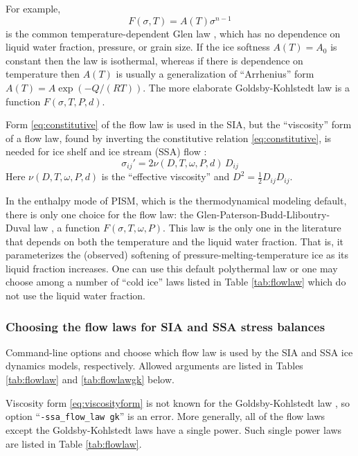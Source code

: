 For example,
\begin{equation}
F(\sigma,T) = A(T) \sigma^{n-1}  \label{eq:glen}
\end{equation}
is the common temperature-dependent Glen law \cite{PatersonBudd,BBL}, which has no dependence on liquid water fraction, pressure, or grain size.  If the ice softness $A(T)=A_0$ is constant then the law is isothermal, whereas if there is dependence on temperature then $A(T)$ is usually a generalization of ``Arrhenius'' form $A(T) = A \exp(-Q/(R T))$.  The more elaborate Goldsby-Kohlstedt law \cite{GoldsbyKohlstedt} is a function $F(\sigma,T,P,d)$.

Form \eqref{eq:constitutive} of the flow law is used in the SIA, but the ``viscosity'' form of a flow law, found by inverting the constitutive relation \eqref{eq:constitutive}, is needed for ice shelf and ice stream (SSA) flow \cite{BBssasliding}:
\begin{equation}
\sigma_{ij}' = 2 \nu(D,T,\omega,P,d)\,D_{ij}  \label{eq:viscosityform}
\end{equation}
Here $\nu(D,T,\omega,P,d)$ is the ``effective viscosity'' and $D^2 = \frac{1}{2} D_{ij} D_{ij}$.

In the enthalpy mode of PISM, which is the thermodynamical modeling default, there is only one choice for the flow law: the Glen-Paterson-Budd-Lliboutry-Duval law \cite{AschwandenBuelerKhroulevBlatter,LliboutryDuval1985,PatersonBudd}, a function $F(\sigma,T,\omega,P)$.  This law is the only one in the literature that depends on both the temperature and the liquid water fraction.  That is, it parameterizes the (observed) softening of pressure-melting-temperature ice as its liquid fraction increases.  One can use this default polythermal law or one may choose among a number of ``cold ice'' laws listed in Table \ref{tab:flowlaw} which do not use the liquid water fraction.  

\subsubsection*{Choosing the flow laws for SIA and SSA stress balances}  Command-line options  and  choose which flow law is used by the SIA and SSA ice dynamics models, respectively.  Allowed arguments are listed in Tables \ref{tab:flowlaw} and \ref{tab:flowlawgk} below.

Viscosity form \eqref{eq:viscosityform} is not known for the Goldsby-Kohlstedt law \cite{GoldsbyKohlstedt}, so option ``\texttt{-ssa_flow_law gk}'' is an error.  More generally, all of the flow laws except the Goldsby-Kohlstedt laws have a single power.  Such single power laws are listed in Table \ref{tab:flowlaw}.


